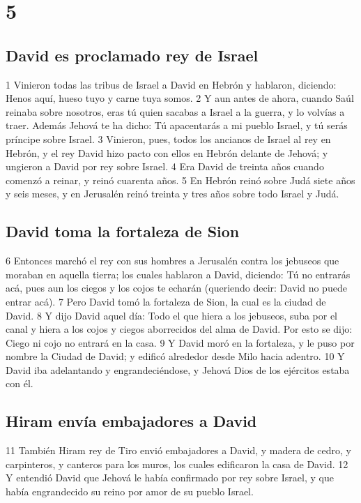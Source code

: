 \chapter{5}

\section*{David es proclamado rey de Israel}

1 Vinieron todas las tribus de Israel a David en Hebrón y hablaron, diciendo: Henos aquí, hueso tuyo y carne tuya somos.
2 Y aun antes de ahora, cuando Saúl reinaba sobre nosotros, eras tú quien sacabas a Israel a la guerra, y lo volvías a traer. Además Jehová te ha dicho: Tú apacentarás a mi pueblo Israel, y tú serás príncipe sobre Israel.
3 Vinieron, pues, todos los ancianos de Israel al rey en Hebrón, y el rey David hizo pacto con ellos en Hebrón delante de Jehová; y ungieron a David por rey sobre Israel.
4 Era David de treinta años cuando comenzó a reinar, y reinó cuarenta años.
5 En Hebrón reinó sobre Judá siete años y seis meses, y en Jerusalén reinó treinta y tres años sobre todo Israel y Judá. 

\section*{David toma la fortaleza de Sion}

6 Entonces marchó el rey con sus hombres a Jerusalén contra los jebuseos que moraban en aquella tierra; los cuales hablaron a David, diciendo: Tú no entrarás acá, pues aun los ciegos y los cojos te echarán (queriendo decir: David no puede entrar acá).
7 Pero David tomó la fortaleza de Sion, la cual es la ciudad de David.
8 Y dijo David aquel día: Todo el que hiera a los jebuseos, suba por el canal y hiera a los cojos y ciegos aborrecidos del alma de David. Por esto se dijo: Ciego ni cojo no entrará en la casa.
9 Y David moró en la fortaleza, y le puso por nombre la Ciudad de David; y edificó alrededor desde Milo hacia adentro.
10 Y David iba adelantando y engrandeciéndose, y Jehová Dios de los ejércitos estaba con él.

\section*{Hiram envía embajadores a David}

11 También Hiram rey de Tiro envió embajadores a David, y madera de cedro, y carpinteros, y canteros para los muros, los cuales edificaron la casa de David.
12 Y entendió David que Jehová le había confirmado por rey sobre Israel, y que había engrandecido su reino por amor de su pueblo Israel.


